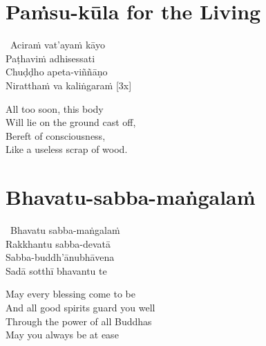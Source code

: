 \suttaRef{[Thai]}



\section{Paṁsu-kūla for the Living}
\label{pamsu-kula-living}

\begin{pali-hangtogether}
  \anglebracketleft\ \hspace{-0.5mm}Aciraṁ vat'ayaṁ kāyo \hspace{-0.5mm}\anglebracketright\ \\
  Paṭhaviṁ adhisessati\\
  Chuḍḍho apeta-viññāṇo\\
  Niratthaṁ va kaliṅgaraṁ \hfill{[3x]}
\end{pali-hangtogether}

\begin{english-verses}
  All too soon, this body\\
  Will lie on the ground cast off,\\
  Bereft of consciousness,\\
  Like a useless scrap of wood.
\end{english-verses}

\suttaRef{[Dhp 41]}


\section{Bhavatu-sabba-maṅgalaṁ}
\label{bhavatu-funeral}

\begin{pali-hangtogether}
  \anglebracketleft\ \hspace{-0.5mm}Bhavatu sabba-maṅgalaṁ \hspace{-0.5mm}\anglebracketright\ \\
  Rakkhantu sabba-devatā\\
  Sabba-buddh'ānubhāvena\\
  Sadā sotthī bhavantu te
\end{pali-hangtogether}

\begin{english-verses}
  May every blessing come to be\\
  And all good spirits guard you well\\
  Through the power of all Buddhas\\
  May you always be at ease
\end{english-verses}

